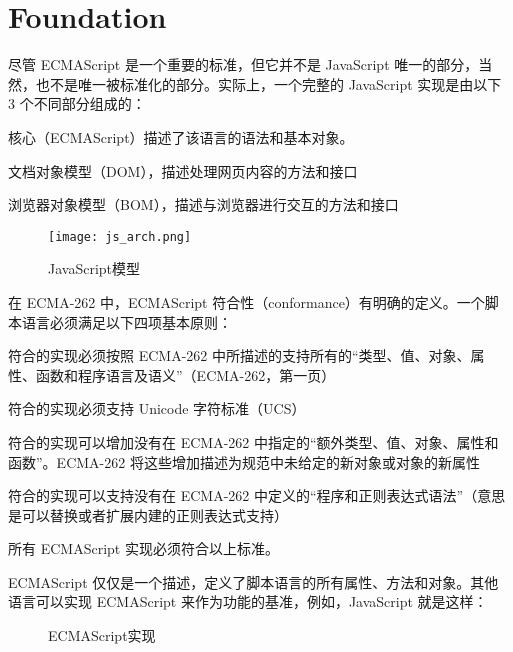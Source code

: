 \part{Foundation}

尽管 ECMAScript 是一个重要的标准，但它并不是 JavaScript 唯一的部分，当然，也不是唯一被标准化的部分。实际上，一个完整的 JavaScript 实现是由以下 3 个不同部分组成的：

\begin{compactitem}
\item 核心（ECMAScript）描述了该语言的语法和基本对象。
\item 文档对象模型（DOM），描述处理网页内容的方法和接口
\item 浏览器对象模型（BOM），描述与浏览器进行交互的方法和接口
\end{compactitem}


\vspace{-10pt}

\begin{figure}[!h]
\centering
\texttt{[image: js\_arch.png]}
\vspace{-20pt}
\caption{JavaScript模型}
\label{js_arch}
\end{figure}


在 ECMA-262 中，ECMAScript 符合性（conformance）有明确的定义。一个脚本语言必须满足以下四项基本原则：

\begin{compactitem}
\item 符合的实现必须按照 ECMA-262 中所描述的支持所有的“类型、值、对象、属性、函数和程序语言及语义”（ECMA-262，第一页）
\item 符合的实现必须支持 Unicode 字符标准（UCS）
\item 符合的实现可以增加没有在 ECMA-262 中指定的“额外类型、值、对象、属性和函数”。ECMA-262 将这些增加描述为规范中未给定的新对象或对象的新属性
\item 符合的实现可以支持没有在 ECMA-262 中定义的“程序和正则表达式语法”（意思是可以替换或者扩展内建的正则表达式支持）
\end{compactitem}

所有 ECMAScript 实现必须符合以上标准。

ECMAScript 仅仅是一个描述，定义了脚本语言的所有属性、方法和对象。其他语言可以实现 ECMAScript 来作为功能的基准，例如，JavaScript 就是这样：

\begin{figure}[!h]
\centering
{}
\caption{ECMAScript实现}
\label{ECMAScript_implement}
\end{figure}

